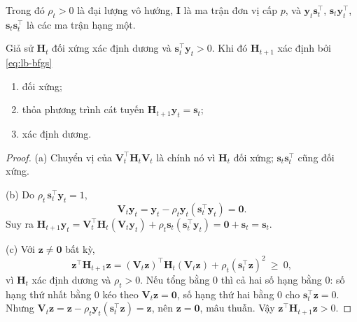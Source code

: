 Trong đó $\rho_t>0$ là đại lượng vô hướng, $\mathbf{I}$ là ma trận đơn vị cấp $p$, và $\mathbf{y}_t\mathbf{s}_t^{\top}$, $\mathbf{s}_t\mathbf{y}_t^{\top}$, $\mathbf{s}_t\mathbf{s}_t^{\top}$ là các ma trận hạng một.

\begin{proposition}\label{prop:lb-bfgs}
Giả sử $\mathbf{H}_t$ đối xứng xác định dương và $\mathbf{s}_t^{\top}\mathbf{y}_t>0$. Khi đó $\mathbf{H}_{t+1}$ xác định bởi \eqref{eq:lb-bfgs}
\begin{enumerate}
  \item[(a)] đối xứng;
  \item[(b)] thỏa phương trình cát tuyến $\mathbf{H}_{t+1}\mathbf{y}_t=\mathbf{s}_t$;
  \item[(c)] xác định dương.
\end{enumerate}
\end{proposition}

\begin{proof}
(a) Chuyển vị của $\mathbf{V}_t^{\top}\mathbf{H}_t\mathbf{V}_t$ là chính nó vì $\mathbf{H}_t$ đối xứng; $\mathbf{s}_t\mathbf{s}_t^{\top}$ cũng đối xứng.

(b) Do $\rho_t\,\mathbf{s}_t^{\top}\mathbf{y}_t=1$,
\begin{equation*}
  \mathbf{V}_t\mathbf{y}_t=\mathbf{y}_t-\rho_t\mathbf{y}_t(\mathbf{s}_t^{\top}\mathbf{y}_t)=\mathbf{0}.
\end{equation*}
Suy ra $\mathbf{H}_{t+1}\mathbf{y}_t=\mathbf{V}_t^{\top}\mathbf{H}_t(\mathbf{V}_t\mathbf{y}_t)+\rho_t\mathbf{s}_t(\mathbf{s}_t^{\top}\mathbf{y}_t)=\mathbf{0}+\mathbf{s}_t=\mathbf{s}_t$.

(c) Với $\mathbf{z}\ne\mathbf{0}$ bất kỳ,
\begin{equation*}
  \mathbf{z}^{\top}\mathbf{H}_{t+1}\mathbf{z}=(\mathbf{V}_t\mathbf{z})^{\top}\mathbf{H}_t(\mathbf{V}_t\mathbf{z})+\rho_t(\mathbf{s}_t^{\top}\mathbf{z})^2\ \ge\ 0,
\end{equation*}
vì $\mathbf{H}_t$ xác định dương và $\rho_t>0$. Nếu tổng bằng $0$ thì cả hai số hạng bằng $0$: số hạng thứ nhất bằng $0$ kéo theo $\mathbf{V}_t\mathbf{z}=\mathbf{0}$, số hạng thứ hai bằng $0$ cho $\mathbf{s}_t^{\top}\mathbf{z}=0$. Nhưng $\mathbf{V}_t\mathbf{z}=\mathbf{z}-\rho_t\mathbf{y}_t(\mathbf{s}_t^{\top}\mathbf{z})=\mathbf{z}$, nên $\mathbf{z}=\mathbf{0}$, mâu thuẫn. Vậy $\mathbf{z}^{\top}\mathbf{H}_{t+1}\mathbf{z}>0$.
\end{proof}

